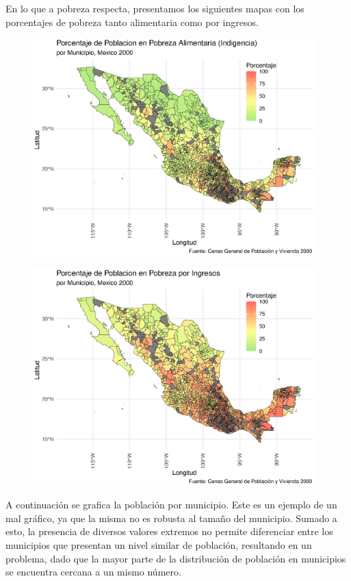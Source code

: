 \documentclass[9pt]{article}
\begin{document}
 En lo que a pobreza respecta, presentamos los siguientes mapas con los porcentajes de pobreza tanto alimentaria como por ingresos. 
 
 \begin{figure}[H]
     \centering
     \includegraphics[width=0.97\textwidth]{figs/povertyalim.eps}
 \end{figure}
 
  \begin{figure}[H]
     \centering
     \includegraphics[width=0.97\textwidth]{figs/povertypat.eps}
 \end{figure}
 A continuaci\'on se grafica la poblaci\'on por municipio. Este es un ejemplo de un mal gr\'afico, ya que la misma no es robusta al tama\~no del municipio. Sumado a esto, la presencia de diversos valores extremos no permite diferenciar entre los municipios que presentan un nivel similar de poblaci\'on, resultando en un problema, dado que la mayor parte de la distribuci\'on de poblaci\'on en municipios se encuentra cercana a un mismo n\'umero. 
 
\end{document}

